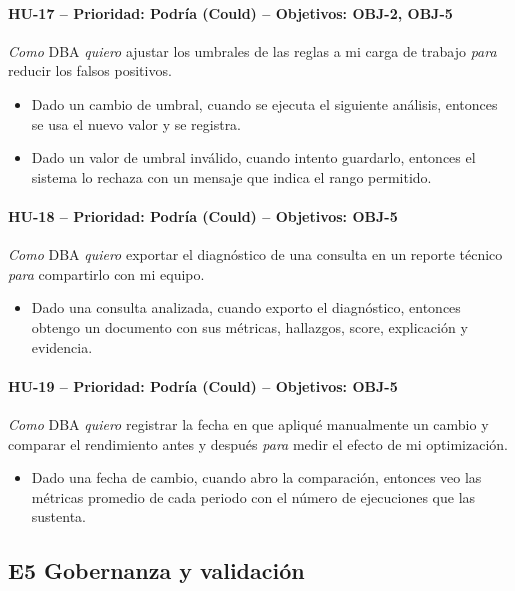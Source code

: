 \documentclass[11pt,a4paper]{report}
\begin{document}
\paragraph{HU-17 -- Prioridad: Podría (Could) -- Objetivos: OBJ-2, OBJ-5}
\textit{Como} DBA \textit{quiero} ajustar los umbrales de las reglas a mi carga de trabajo \textit{para} reducir los falsos positivos.
\begin{itemize}[leftmargin=1.3em,itemsep=1pt]
\item[\textbf{CA-HU17.1}] Dado un cambio de umbral, cuando se ejecuta el siguiente análisis, entonces se usa el nuevo valor y se registra.
\item[\textbf{CA-HU17.2}] Dado un valor de umbral inválido, cuando intento guardarlo, entonces el sistema lo rechaza con un mensaje que indica el rango permitido.
\end{itemize}

\paragraph{HU-18 -- Prioridad: Podría (Could) -- Objetivos: OBJ-5}
\textit{Como} DBA \textit{quiero} exportar el diagnóstico de una consulta en un reporte técnico \textit{para} compartirlo con mi equipo.
\begin{itemize}[leftmargin=1.3em,itemsep=1pt]
\item[\textbf{CA-HU18.1}] Dado una consulta analizada, cuando exporto el diagnóstico, entonces obtengo un documento con sus métricas, hallazgos, score, explicación y evidencia.
\end{itemize}

\paragraph{HU-19 -- Prioridad: Podría (Could) -- Objetivos: OBJ-5}
\textit{Como} DBA \textit{quiero} registrar la fecha en que apliqué manualmente un cambio y comparar el rendimiento antes y después \textit{para} medir el efecto de mi optimización.
\begin{itemize}[leftmargin=1.3em,itemsep=1pt]
\item[\textbf{CA-HU19.1}] Dado una fecha de cambio, cuando abro la comparación, entonces veo las métricas promedio de cada periodo con el número de ejecuciones que las sustenta.
\end{itemize}

\subsection{E5 Gobernanza y validación}
\end{document}
